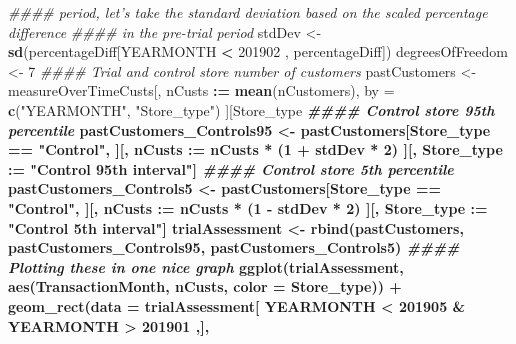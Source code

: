 \documentclass[
]{article}
\newenvironment{Shaded}{\begin{snugshade}}{\end{snugshade}}
\newcommand{\CommentTok}[1]{\textcolor[rgb]{0.56,0.35,0.01}{\textit{#1}}}
\newcommand{\DataTypeTok}[1]{\textcolor[rgb]{0.13,0.29,0.53}{#1}}
\newcommand{\DecValTok}[1]{\textcolor[rgb]{0.00,0.00,0.81}{#1}}
\newcommand{\ErrorTok}[1]{\textcolor[rgb]{0.64,0.00,0.00}{\textbf{#1}}}
\newcommand{\KeywordTok}[1]{\textcolor[rgb]{0.13,0.29,0.53}{\textbf{#1}}}
\newcommand{\NormalTok}[1]{#1}
\newcommand{\OperatorTok}[1]{\textcolor[rgb]{0.81,0.36,0.00}{\textbf{#1}}}
\newcommand{\StringTok}[1]{\textcolor[rgb]{0.31,0.60,0.02}{#1}}
\begin{document}
\begin{Shaded}
\begin{Highlighting}[]
\CommentTok{#### period, let's take the standard deviation based on the scaled percentage difference}
\CommentTok{#### in the pre-trial period}
\NormalTok{stdDev <-}\StringTok{ }\KeywordTok{sd}\NormalTok{(percentageDiff[YEARMONTH }\OperatorTok{<}\StringTok{ }\DecValTok{201902}\NormalTok{ , percentageDiff])}
\NormalTok{degreesOfFreedom <-}\StringTok{ }\DecValTok{7}
\CommentTok{#### Trial and control store number of customers}
\NormalTok{pastCustomers <-}\StringTok{ }\NormalTok{measureOverTimeCusts[, nCusts }\OperatorTok{:}\ErrorTok{=}\StringTok{ }\KeywordTok{mean}\NormalTok{(nCustomers), by =}
\KeywordTok{c}\NormalTok{(}\StringTok{"YEARMONTH"}\NormalTok{, }\StringTok{"Store_type"}\NormalTok{)}
\NormalTok{                              ][Store_type }\OperatorTok{%
\CommentTok{#### Control store 95th percentile}
\NormalTok{pastCustomers_Controls95 <-}\StringTok{ }\NormalTok{pastCustomers[Store_type }\OperatorTok{==}\StringTok{ "Control"}\NormalTok{,}
\NormalTok{                                ][, nCusts }\OperatorTok{:}\ErrorTok{=}\StringTok{ }\NormalTok{nCusts }\OperatorTok{*}\StringTok{ }\NormalTok{(}\DecValTok{1} \OperatorTok{+}\StringTok{ }\NormalTok{stdDev }\OperatorTok{*}\StringTok{ }\DecValTok{2}\NormalTok{)}
\NormalTok{                                ][, Store_type }\OperatorTok{:}\ErrorTok{=}\StringTok{ "Control 95th %
\StringTok{interval"}\NormalTok{]}
\CommentTok{#### Control store 5th percentile}
\NormalTok{pastCustomers_Controls5 <-}\StringTok{ }\NormalTok{pastCustomers[Store_type }\OperatorTok{==}\StringTok{ "Control"}\NormalTok{,}
\NormalTok{                              ][, nCusts }\OperatorTok{:}\ErrorTok{=}\StringTok{ }\NormalTok{nCusts }\OperatorTok{*}\StringTok{ }\NormalTok{(}\DecValTok{1} \OperatorTok{-}\StringTok{ }\NormalTok{stdDev }\OperatorTok{*}\StringTok{ }\DecValTok{2}\NormalTok{)}
\NormalTok{                              ][, Store_type }\OperatorTok{:}\ErrorTok{=}\StringTok{ "Control 5th %
\StringTok{interval"}\NormalTok{]}
\NormalTok{trialAssessment <-}\StringTok{ }\KeywordTok{rbind}\NormalTok{(pastCustomers, pastCustomers_Controls95,}
\NormalTok{pastCustomers_Controls5)}
\CommentTok{#### Plotting these in one nice graph}
\KeywordTok{ggplot}\NormalTok{(trialAssessment, }\KeywordTok{aes}\NormalTok{(TransactionMonth, nCusts, }\DataTypeTok{color =}\NormalTok{ Store_type)) }\OperatorTok{+}
\StringTok{  }\KeywordTok{geom_rect}\NormalTok{(}\DataTypeTok{data =}\NormalTok{ trialAssessment[ YEARMONTH }\OperatorTok{<}\StringTok{ }\DecValTok{201905} \OperatorTok{&}\StringTok{ }\NormalTok{YEARMONTH }\OperatorTok{>}\StringTok{ }\DecValTok{201901}\NormalTok{ ,],}
}}}
\end{Highlighting}
\end{Shaded}
\end{document}
